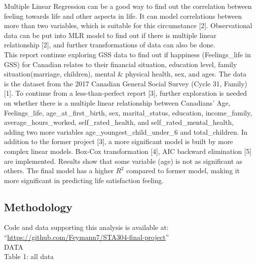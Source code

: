 \documentclass[
]{article}
\begin{document}
Multiple Linear Regression can be a good way to find out the correlation
between feeling towards life and other aspects in life. It can model
correlations between more than two variables, which is suitable for this
circumstance {[}2{]}. Observational data can be put into MLR model to
find out if there is multiple linear relationship {[}2{]}, and further
transformations of data can also be done.\\

This report continue exploring GSS data to find out if happiness
(Feelings\_life in GSS) for Canadian relates to their financial
situation, education level, family situation(marriage, children), mental
\& physical health, sex, and ages. The data is the dataset from the 2017
Canadian General Social Survey (Cycle 31, Family) {[}1{]}. To continue
from a less-than-perfect report {[}3{]}, further exploration is needed
on whether there is a multiple linear relationship between Canadians'
Age, Feelings\_life, age\_at\_first\_birth, sex, marital\_status,
education, income\_family, average\_hours\_worked, self\_rated\_health,
and self\_rated\_mental\_health, adding two more variables
age\_youngest\_child\_under\_6 and total\_children. In addition to the
former project {[}3{]}, a more significant model is built by more
complex linear models. Box-Cox transformation {[}4{]}, AIC backward
elimination {[}5{]} are implemented. Results show that some variable
(age) is not as significant as others. The final model has a higher
\(R^2\) compared to former model, making it more significant in
predicting life satisfaction feeling.\\

\hypertarget{methodology}{%
\subsection{Methodology}\label{methodology}}

Code and data supporting this analysis is available at:
``\url{https://github.com/Feymann7/STA304-final-project}''\\

DATA\\
Table 1: all data\\
\end{document}
